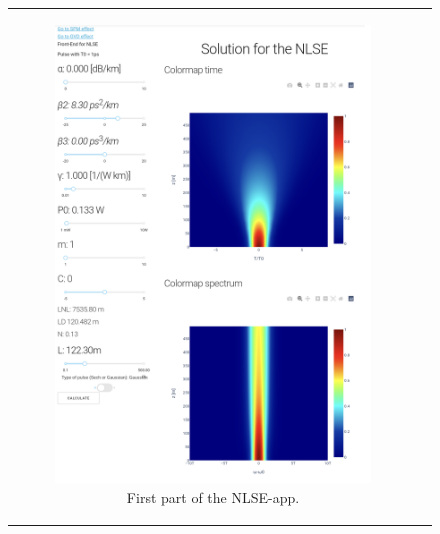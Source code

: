     \begin{figure}[label={fig:herokunlse}, caption={NLSE-App accesed via Google Chrome in an Android device.}]
        \centering
        \begin{tabular}[c]{cc}
        \centering
        \begin{subfigure}[b]{.53\textwidth}
		    \centering	
            \includegraphics[width=1\textwidth]{figures/chap4/android_nlse1.png}
            \caption{First part of the NLSE-app.}
            \label{fig:herokunlse1}
        \end{subfigure}
        \hfill
        \begin{subfigure}[b]{.53\textwidth}
		    \centering	

\end{subfigure}
\end{tabular}
\end{figure}
